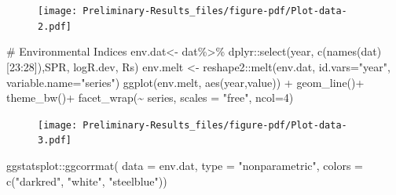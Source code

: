 \documentclass[
  letterpaper,
  DIV=11,
  numbers=noendperiod]{scrartcl}
\newenvironment{Shaded}{\begin{snugshade}}{\end{snugshade}}
\newcommand{\AttributeTok}[1]{\textcolor[rgb]{0.40,0.45,0.13}{#1}}
\newcommand{\CommentTok}[1]{\textcolor[rgb]{0.37,0.37,0.37}{#1}}
\newcommand{\DecValTok}[1]{\textcolor[rgb]{0.68,0.00,0.00}{#1}}
\newcommand{\FunctionTok}[1]{\textcolor[rgb]{0.28,0.35,0.67}{#1}}
\newcommand{\NormalTok}[1]{\textcolor[rgb]{0.00,0.23,0.31}{#1}}
\newcommand{\OtherTok}[1]{\textcolor[rgb]{0.00,0.23,0.31}{#1}}
\newcommand{\SpecialCharTok}[1]{\textcolor[rgb]{0.37,0.37,0.37}{#1}}
\newcommand{\StringTok}[1]{\textcolor[rgb]{0.13,0.47,0.30}{#1}}
\begin{document}
\begin{figure}[H]

{\centering \texttt{[image: Preliminary-Results\_files/figure-pdf/Plot-data-2.pdf]}

}

\end{figure}

\begin{Shaded}
\begin{Highlighting}[]
\CommentTok{\# Environmental Indices}
\NormalTok{env.dat}\OtherTok{\textless{}{-}}\NormalTok{ dat}\SpecialCharTok{\%\textgreater{}\%} 
\NormalTok{  dplyr}\SpecialCharTok{::}\FunctionTok{select}\NormalTok{(year, }\FunctionTok{c}\NormalTok{(}\FunctionTok{names}\NormalTok{(dat)[}\DecValTok{23}\SpecialCharTok{:}\DecValTok{28}\NormalTok{]),SPR, logR.dev, Rs)}
\NormalTok{env.melt }\OtherTok{\textless{}{-}}\NormalTok{ reshape2}\SpecialCharTok{::}\FunctionTok{melt}\NormalTok{(env.dat, }\AttributeTok{id.vars=}\StringTok{"year"}\NormalTok{, }\AttributeTok{variable.name=}\StringTok{"series"}\NormalTok{)}
\FunctionTok{ggplot}\NormalTok{(env.melt, }\FunctionTok{aes}\NormalTok{(year,value)) }\SpecialCharTok{+}
  \FunctionTok{geom\_line}\NormalTok{()}\SpecialCharTok{+} 
  \FunctionTok{theme\_bw}\NormalTok{()}\SpecialCharTok{+}
  \FunctionTok{facet\_wrap}\NormalTok{(}\SpecialCharTok{\textasciitilde{}}\NormalTok{ series, }\AttributeTok{scales =} \StringTok{"free"}\NormalTok{, }\AttributeTok{ncol=}\DecValTok{4}\NormalTok{)}
\end{Highlighting}
\end{Shaded}

\begin{figure}[H]

{\centering \texttt{[image: Preliminary-Results\_files/figure-pdf/Plot-data-3.pdf]}

}

\end{figure}

\begin{Shaded}
\begin{Highlighting}[]
\NormalTok{ggstatsplot}\SpecialCharTok{::}\FunctionTok{ggcorrmat}\NormalTok{(}
  \AttributeTok{data =}\NormalTok{ env.dat,}
  \AttributeTok{type =} \StringTok{"nonparametric"}\NormalTok{, }
  \AttributeTok{colors =} \FunctionTok{c}\NormalTok{(}\StringTok{"darkred"}\NormalTok{, }\StringTok{"white"}\NormalTok{, }\StringTok{"steelblue"}\NormalTok{))}
\end{Highlighting}
\end{Shaded}
\end{document}
